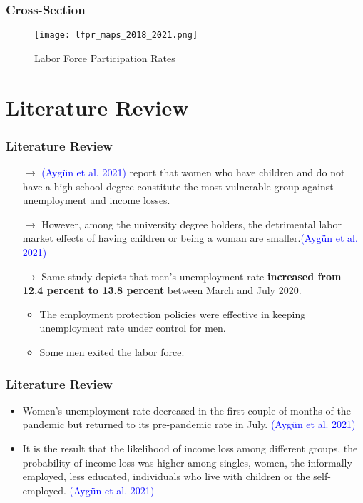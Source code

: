 \documentclass[
	11pt, %
]{beamer}
\begin{document}
\begin{frame}
    \frametitle{Cross-Section}
    \begin{figure}
    \centering
    \texttt{[image: lfpr\_maps\_2018\_2021.png]}
    \caption{Labor Force Participation Rates}
    \label{fig:lfpr}
\end{figure}
\end{frame}




\section{Literature Review}
\begin{frame}
    \frametitle{Literature Review}
        \begin{itemize} 
            \item[$\rightarrow$] \textcolor{blue}{(Aygün et al. 2021)} report that women who have children and do not have a high school degree constitute the most vulnerable group  against unemployment and income losses. 

             \item[$\rightarrow$] However, among the university degree holders, the detrimental labor market effects of having children or being a woman are smaller.\textcolor{blue}{(Aygün et al. 2021)}
           
            \item[$\rightarrow$] Same study depicts that men’s unemployment rate \textbf{increased from 12.4 percent to 13.8 percent} between March and July 2020. 
            \begin{itemize}
                \item The employment protection policies were effective in keeping unemployment rate under control for men.
                \item Some men exited the labor force.
            \end{itemize} 

        \end{itemize}   
    
    
\end{frame}

\begin{frame}

    \frametitle{Literature Review}
    \begin{itemize}
        \item  Women’s unemployment rate decreased in the first couple of months of the pandemic but returned to its pre-pandemic rate in July. \textcolor{blue}{(Aygün et al. 2021)}
        \item It is the result that the likelihood of income loss among different groups, the probability of income loss was higher among singles, women, the informally employed, less educated, individuals who live with children or the self-employed. \textcolor{blue}{(Aygün et al. 2021)}
    \end{itemize}
\end{frame}
\end{document}
